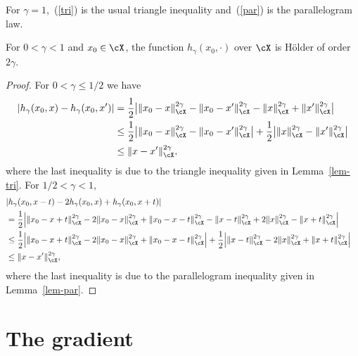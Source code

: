 \documentclass[preprint,12pt,authoryear]{elsarticle}
\DeclarePairedDelimiter{\abs}{\lvert}{\rvert}
\DeclarePairedDelimiter{\norm}{\lVert}{\rVert}
\begin{document}
\noindent
For $\gamma=1$,~(\ref{tri}) is the usual triangle inequality and~(\ref{par}) is the parallelogram law.




\begin{lemma}\label{lem-hol1}
	For $0<\gamma<1$ and $x_0\in\cX$, the function $h_\gamma(x_0,\cdot)$ over $\cX$ is H\"older of order~$2\gamma$.
\end{lemma}
\begin{proof}
	For $0<\gamma\le 1/2$ we have 
	\begin{align*}
	\abs{h_\gamma(x_0,x)-h_\gamma(x_0,x')} 
	&= 
	\frac12\abs[\big]{\norm{x_0-x}_\cX^{2\gamma} - \norm{x_0-x'}_\cX^{2\gamma} - \norm{x}_\cX^{2\gamma} + \norm{x'}_\cX^{2\gamma}} \\
	&\le 
	\frac12\abs[\big]{\norm{x_0-x}_\cX^{2\gamma} - \norm{x_0-x'}_\cX^{2\gamma}} + \frac12\abs[\big]{ \norm{x}_\cX^{2\gamma} - \norm{x'}_\cX^{2\gamma}} \\
	&\le \norm{x-x'}_\cX^{2\gamma},
	\end{align*}
	where the last inequality is due to the triangle inequality given in Lemma~\ref{lem-tri}. 
	For $1/2<\gamma<1$,
	\begin{align*}
	\lefteqn{\abs{h_\gamma(x_0,x-t)-2h_\gamma(x_0,x)+h_\gamma(x_0,x+t)} }\\
	&= 
	\frac12\abs[\Big]{\norm{x_0-x+t}_\cX^{2\gamma} - 2\norm{x_0-x}_\cX^{2\gamma} + \norm{x_0-x-t}_\cX^{2\gamma} - \norm{x-t}_\cX^{2\gamma} + 2\norm{x}_\cX^{2\gamma} - \norm{x+t}_\cX^{2\gamma}} \\
	&\le 
	\frac12\abs[\Big]{\norm{x_0-x+t}_\cX^{2\gamma} - 2\norm{x_0-x}_\cX^{2\gamma} + \norm{x_0-x-t}_\cX^{2\gamma}} +
	\frac12\abs[\Big]{\norm{x-t}_\cX^{2\gamma} - 2\norm{x}_\cX^{2\gamma} + \norm{x+t}_\cX^{2\gamma}} \\
	&\le \norm{x-x'}_\cX^{2\gamma},
	\end{align*}
	where the last inequality is due to the parallelogram inequality given in Lemma~\ref{lem-par}.
\end{proof}






\section{The gradient}\label{app-grad}
\end{document}
